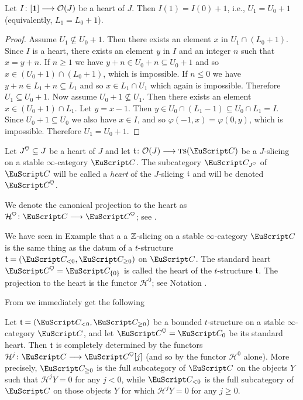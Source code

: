 \begin{lemma}\label{lemma.plus.one}
Let $I\colon [\mathbf{1}] \longrightarrow \mathcal{O}(J)$ be a heart of $J$. Then $I(1)=I(0)+1$, i.e., $U_1=U_0+1$ (equivalently, $L_1=L_0+1$).
\end{lemma}
\begin{proof}
Assume $U_1\nsubseteq U_0+1$. Then there exists an element $x$ in $U_1\cap(L_0+1)$. Since $I$ is a heart, there exists an element $y$ in $I$ and an integer $n$ such that $x=y+n$. If $n\geq 1$ we have $y+n\in U_0+n\subseteq U_0+1$ and so $x\in (U_0+1)\cap (L_0+1)$, which is impossible. If $n\leq 0$ we have $y+n\in L_1+n\subseteq L_1$ and so $x\in L_1\cap U_1$ which again is impossible. Therefore $U_1\subseteq U_0+1$. Now assume $U_0+1\nsubseteq U_1$. Then there exists an element $x\in (U_0+1)\cap L_1$. Let $y=x-1$. Then $y\in U_0\cap (L_1-1)\subseteq U_0\cap L_1=I$. Since $U_0+1\subseteq U_0$ we also have $x\in I$, and so $\varphi(-1,x)=\varphi(0,y)$, which is impossible. Therefore $U_1= U_0+1$.
\end{proof}
\begin{definition}
Let $J^\heart\subseteq J$ be a heart of $J$ and let $\tee\colon \O(J)\to  \ts(\C)$ be a $J$-slicing on a stable $\infty$-category $\C$. The subcategory $\C_{J^\heart}$ of $\C$ will be called a \emph{heart} of the $J$-slicing $\mathfrak{t}$ and will be denoted $\C^\heart$.
\end{definition}
\begin{notat}
We denote the canonical projection to the heart as $\mathcal{H}^\heart\colon \C\to \C^\heart$; see \adef{}.
\end{notat}
\begin{example}
We have seen in Example that a  a $\mathbb{Z}$-slicing on a stable $\infty$-category $\C$ is the same thing as the datum of a $t$-structure $\tee=(\C_{<0},\C_{\geq 0})$ on $\C$. The standard heart $\C^\heart=\C_{\{0\}}$ is called the heart of the $t$-structure $\mathfrak{t}$. The projection to the heart is the functor $\mathcal{H}^0$; see Notation .
\end{example}

From  we immediately get the following
\begin{proposition}\label{cor.oss.for.Heart.to.t}
Let $\tee=(\C_{<0},\C_{\geq 0})$ be a bounded $t$-structure on a stable $\infty$-category $\C$, and let $\C^\heart=\C_0$ be its standard heart. Then $\mathfrak{t}$ is completely determined by the functors $\mathcal{H}^j\colon \C \to \C^\heart[j]$ (and so by the functor $\mathcal{H}^0$ alone). More precisely, $\C_{\geq 0}$ is the full subcategory of $\C$ on the objects $Y$ such  that $\mathcal{H}^jY=0$ for any $j< 0$, while $\C_{< 0}$ is the full subcategory of $\C$ on those objects $Y$ for which $\mathcal{H}^jY=0$ for any $j\geq 0$.
\end{proposition}


